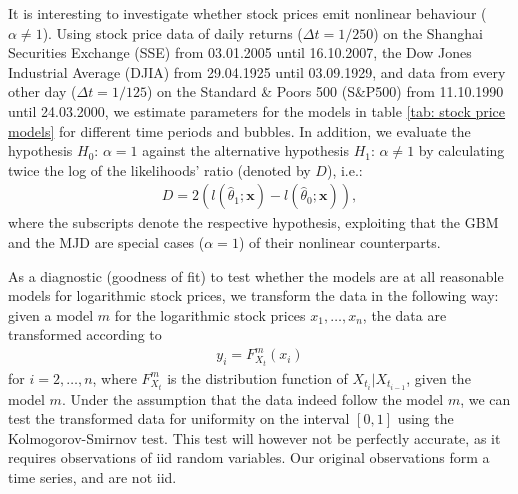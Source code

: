 	
	It is interesting to investigate whether stock prices emit nonlinear behaviour ($\alpha\neq 1$).
	Using stock price data of daily returns ($\Delta t = 1/250$) on the Shanghai Securities Exchange (SSE) from 03.01.2005 until 16.10.2007, the Dow Jones Industrial Average (DJIA) from 29.04.1925 until 03.09.1929, and data from every other day ($\Delta t=1/125$) on the Standard \& Poors 500 (S\&P500) from 11.10.1990 until 24.03.2000, we estimate parameters for the models in table \ref{tab: stock price models} for different time periods and bubbles.
	In addition, we evaluate the hypothesis $H_0:\,\alpha=1$ against the alternative hypothesis $H_1:\,\alpha\neq1$ by calculating twice the log of the likelihoods' ratio (denoted by $D$), i.e.:
	\begin{align}\label{eq: statistic twice log liklihood ratio}
	D = 2\left( l(\hat{\theta}_1;\mathbf{x}) - l(\hat{\theta}_0;\mathbf{x})   \right),
	\end{align}
	where the subscripts denote the respective hypothesis,
	exploiting that the GBM and the MJD are special cases ($\alpha=1$) of their nonlinear counterparts.
	
	As a diagnostic (goodness of fit) to test whether the models are at all reasonable models for logarithmic stock prices, we transform the data in the following way:
	given a model $m$ for the logarithmic stock prices $x_1,\ldots,x_n$, the data are transformed according to
	\begin{align}\label{eq: transform to uniformity}
	y_i = F_{X_t}^m(x_i)
	\end{align}
	for $i=2,\ldots, n$, where $F_{X_t}^m$ is the distribution function of $X_{t_i}|X_{t_{i-1}}$, given the model $m$.
	Under the assumption that the data indeed follow the model $m$, we can test the transformed data for uniformity on the interval $[0,1]$ using the Kolmogorov-Smirnov test.
	This test will however not be perfectly accurate, as it requires observations of iid random variables. Our original observations form a time series, and are not iid.
	

